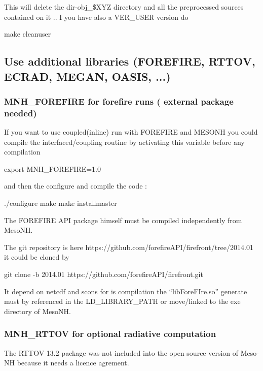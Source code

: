 This will delete the dir-obj\_\${XYZ} directory and all the preprocessed sources contained on it .. I you have also a VER\_USER version do
\begin{bashcode}
make cleanuser
\end{bashcode}

\subsection{Use additional libraries (FOREFIRE, RTTOV, ECRAD, MEGAN, OASIS, ...)}

\subsubsection{MNH\_FOREFIRE for forefire runs ( external package needed)}

If you want to use coupled(inline) run with FOREFIRE and MESONH you could compile the interfaced/coupling routine by activating this variable before any compilation
\begin{bashcode}
export MNH_FOREFIRE=1.0
\end{bashcode}
and then the configure and compile the code :
\begin{bashcode}
./configure
make
make installmaster
\end{bashcode}

The FOREFIRE API package himself must be compiled independently from MesoNH.

The git repository is here https://github.com/forefireAPI/firefront/tree/2014.01 it could be cloned by
\begin{bashcode}
git clone -b 2014.01 https://github.com/forefireAPI/firefront.git
\end{bashcode}

It depend on netcdf and scons for is compilation the ``libForeFIre.so'' generate must by referenced in the LD\_LIBRARY\_PATH or move/linked to the exe directory of MesoNH.

\subsubsection{MNH\_RTTOV for optional radiative computation}

The RTTOV 13.2 package was not included into the open source version of Meso-NH because it needs a licence agrement.

